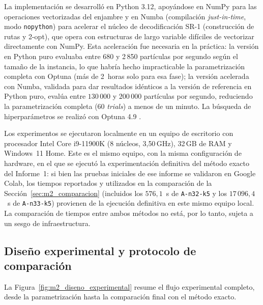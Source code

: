 La implementación se desarrolló en Python 3.12, apoyándose en NumPy
\parencite{harris2020array} para las operaciones vectorizadas del enjambre y en
Numba \parencite{lam2015numba} (compilación \textit{just-in-time}, modo
\texttt{nopython}) para acelerar el núcleo de decodificación SR-1 (construcción de rutas
y 2-opt), que opera con estructuras de largo variable difíciles de vectorizar
directamente con NumPy. Esta aceleración fue necesaria en la práctica: la versión en
Python puro evaluaba entre 680 y 2\,850 partículas por segundo según el tamaño de la
instancia, lo que habría hecho impracticable la parametrización completa con Optuna
(más de 2~horas solo para esa fase); la versión acelerada con Numba, validada para dar
resultados idénticos a la versión de referencia en Python puro, evalúa entre
$130\,000$ y $200\,000$ partículas por segundo, reduciendo la parametrización completa
(60 \textit{trials}) a menos de un minuto. La búsqueda de hiperparámetros se realizó con
Optuna 4.9 \parencite{akiba2019optuna}.

Los experimentos se ejecutaron localmente en un equipo de escritorio con procesador
Intel Core i9-11900K (8 núcleos, 3{,}50\,GHz), 32\,GB de RAM y Windows~11 Home. Este es
el mismo equipo, con la misma configuración de hardware, en el que se ejecutó la
experimentación definitiva del método exacto del Informe~1: si bien las pruebas
iniciales de ese informe se validaron en Google Colab, los tiempos reportados y
utilizados en la comparación de la Sección~\ref{sec:m2_comparacion} (incluidos los
$576{,}1$~s de \texttt{A-n32-k5} y los $17\,096{,}4$~s de \texttt{A-n33-k5}) provienen de
la ejecución definitiva en este mismo equipo local. La comparación de tiempos entre
ambos métodos no está, por lo tanto, sujeta a un sesgo de infraestructura.


\subsection{Diseño experimental y protocolo de comparación}

La Figura~\ref{fig:m2_diseno_experimental} resume el flujo experimental completo, desde
la parametrización hasta la comparación final con el método exacto.

